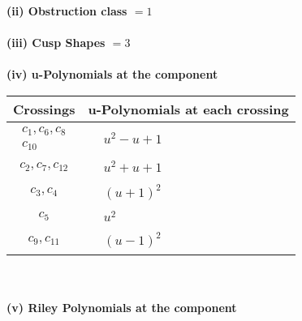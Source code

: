\documentclass[1p]{elsarticle_modified}
\theoremstyle{definition}
\begin{document}
\flushleft \textbf{(ii) Obstruction class $= 1$}\\~\\
\flushleft \textbf{(iii) Cusp Shapes $= 3$}\\~\\
\newpage\renewcommand{\arraystretch}{1}
\flushleft \textbf{(iv) u-Polynomials at the component}\newline \\
\begin{tabular}{m{50pt}|m{274pt}}
Crossings & \hspace{64pt}u-Polynomials at each crossing \\
\hline $$\begin{aligned}c_{1},c_{6},c_{8}\\c_{10}\end{aligned}$$&$\begin{aligned}
&u^2- u+1
\end{aligned}$\\
\hline $$\begin{aligned}c_{2},c_{7},c_{12}\end{aligned}$$&$\begin{aligned}
&u^2+u+1
\end{aligned}$\\
\hline $$\begin{aligned}c_{3},c_{4}\end{aligned}$$&$\begin{aligned}
&(u+1)^2
\end{aligned}$\\
\hline $$\begin{aligned}c_{5}\end{aligned}$$&$\begin{aligned}
&u^2
\end{aligned}$\\
\hline $$\begin{aligned}c_{9},c_{11}\end{aligned}$$&$\begin{aligned}
&(u-1)^2
\end{aligned}$\\
\hline
\end{tabular}\\~\\
\newpage\renewcommand{\arraystretch}{1}
\flushleft \textbf{(v) Riley Polynomials at the component}\newline \\
\end{document}
